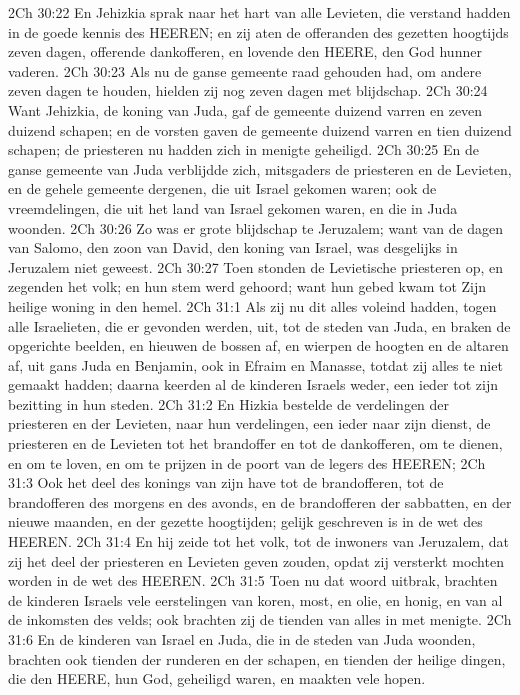 2Ch 30:22  En Jehizkia sprak naar het hart van alle Levieten, die verstand hadden in de goede kennis des HEEREN; en zij aten de offeranden des gezetten hoogtijds zeven dagen, offerende dankofferen, en lovende den HEERE, den God hunner vaderen.
2Ch 30:23  Als nu de ganse gemeente raad gehouden had, om andere zeven dagen te houden, hielden zij nog zeven dagen met blijdschap.
2Ch 30:24  Want Jehizkia, de koning van Juda, gaf de gemeente duizend varren en zeven duizend schapen; en de vorsten gaven de gemeente duizend varren en tien duizend schapen; de priesteren nu hadden zich in menigte geheiligd.
2Ch 30:25  En de ganse gemeente van Juda verblijdde zich, mitsgaders de priesteren en de Levieten, en de gehele gemeente dergenen, die uit Israel gekomen waren; ook de vreemdelingen, die uit het land van Israel gekomen waren, en die in Juda woonden.
2Ch 30:26  Zo was er grote blijdschap te Jeruzalem; want van de dagen van Salomo, den zoon van David, den koning van Israel, was desgelijks in Jeruzalem niet geweest.
2Ch 30:27  Toen stonden de Levietische priesteren op, en zegenden het volk; en hun stem werd gehoord; want hun gebed kwam tot Zijn heilige woning in den hemel.
2Ch 31:1  Als zij nu dit alles voleind hadden, togen alle Israelieten, die er gevonden werden, uit, tot de steden van Juda, en braken de opgerichte beelden, en hieuwen de bossen af, en wierpen de hoogten en de altaren af, uit gans Juda en Benjamin, ook in Efraim en Manasse, totdat zij alles te niet gemaakt hadden; daarna keerden al de kinderen Israels weder, een ieder tot zijn bezitting in hun steden.
2Ch 31:2  En Hizkia bestelde de verdelingen der priesteren en der Levieten, naar hun verdelingen, een ieder naar zijn dienst, de priesteren en de Levieten tot het brandoffer en tot de dankofferen, om te dienen, en om te loven, en om te prijzen in de poort van de legers des HEEREN;
2Ch 31:3  Ook het deel des konings van zijn have tot de brandofferen, tot de brandofferen des morgens en des avonds, en de brandofferen der sabbatten, en der nieuwe maanden, en der gezette hoogtijden; gelijk geschreven is in de wet des HEEREN.
2Ch 31:4  En hij zeide tot het volk, tot de inwoners van Jeruzalem, dat zij het deel der priesteren en Levieten geven zouden, opdat zij versterkt mochten worden in de wet des HEEREN.
2Ch 31:5  Toen nu dat woord uitbrak, brachten de kinderen Israels vele eerstelingen van koren, most, en olie, en honig, en van al de inkomsten des velds; ook brachten zij de tienden van alles in met menigte.
2Ch 31:6  En de kinderen van Israel en Juda, die in de steden van Juda woonden, brachten ook tienden der runderen en der schapen, en tienden der heilige dingen, die den HEERE, hun God, geheiligd waren, en maakten vele hopen.
